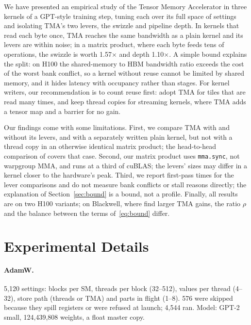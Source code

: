 \documentclass[10pt]{article}
\newcommand{\x}{\ensuremath{\times}}
\begin{document}
We have presented an empirical study of the Tensor Memory Accelerator in three kernels of a GPT-style training step,
tuning each over its full space of settings and isolating TMA's two levers, the swizzle and pipeline depth. In kernels that
read each byte once, TMA reaches the same bandwidth as a plain kernel and its levers are within noise; in a matrix product,
where each byte feeds tens of operations, the swizzle is worth 1.57\x{} and depth 1.10\x{}. A simple bound explains the
split: on H100 the shared-memory to HBM bandwidth ratio exceeds the cost of the worst bank conflict, so a kernel without
reuse cannot be limited by shared memory, and it hides latency with occupancy rather than stages. For kernel writers, our
recommendation is to count reuse first: adopt TMA for tiles that are read many times, and keep thread copies for
streaming kernels, where TMA adds a tensor map and a barrier for no gain.

Our findings come with some limitations. First, we compare TMA with and without its levers, and with a separately written
plain kernel, but not with a thread copy in an otherwise identical matrix product; the head-to-head comparison of
\citet{bose2026tma} covers that case. Second, our matrix product uses \texttt{mma.sync}, not warpgroup MMA, and runs at a
third of cuBLAS; the levers' sizes may differ in a kernel closer to the hardware's peak. Third, we report first-pass times
for the lever comparisons and do not measure bank conflicts or stall reasons directly; the explanation of
Section~\ref{sec:bound} is a bound, not a profile. Finally, all results are on two H100 variants; on Blackwell, where
\citet{bose2026tma} find larger TMA gains, the ratio $\rho$ and the balance between the terms of~\eqref{eq:bound} differ.




\newpage
\appendix

\section{Experimental Details}
\label{app:spaces}

\paragraph{AdamW.}
5{,}120 settings: blocks per SM, threads per block (32--512), values per thread (4--32), store path (threads or TMA) and
parts in flight (1--8). 576 were skipped because they spill registers or were refused at launch; 4{,}544 ran. Model: GPT-2
small, 124{,}439{,}808 weights, a float master copy.
\end{document}
